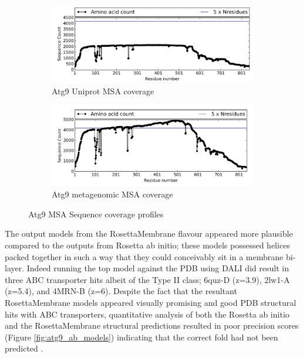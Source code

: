 \begin{figure}[htb]
\begin{subfigure}{0.5\textwidth}
  \includegraphics[width=\linewidth]{introduction/atg9_mas_uni.png}
  \caption{Atg9 Uniprot MSA coverage}
  \label{fig:0}
\end{subfigure}\hfil %
\begin{subfigure}{0.5\textwidth}
  \includegraphics[width=\linewidth]{introduction/atg9_msa_meta.png}
  \caption{Atg9 metagenomic MSA coverage}
  \label{fig:1}
\end{subfigure}\hfil %
\caption{Atg9 MSA Sequence coverage profiles}
\small
\label{fig:atg9_msa}
\end{figure}

The output models from the RosettaMembrane flavour appeared more plausible compared to the outputs from Rosetta ab initio;  these models possessed helices packed together in such a way that they could conceivably sit in a membrane bi-layer.  Indeed running the top model against the PDB using DALI did result in three ABC transporter hits albeit of the Type II class; 6quz-D (z=3.9), 2lw1-A (z=5.4),  and 4MRN-B (z=6).  Despite the fact that the resultant RosettaMembrane models appeared visually promising and good PDB structural hits with ABC transporters, quantitative analysis of both the Rosetta ab initio and the RosettaMembrane  structural predictions resulted in poor precision scores (Figure \ref{fig:atg9_ab_models}) indicating that the correct fold had not been predicted \cite{DeOliveira2016}.

